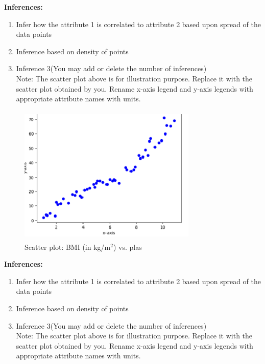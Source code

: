 \documentclass[12 pt, a4paper]{article}
\theoremstyle{definition}
\begin{document}
\textbf{\Large Inferences:}
\begin{enumerate}
   \item Infer how the attribute 1 is correlated to attribute 2 based upon spread of the data points
   \item Inference based on density of points
   \item Inference 3(You may add or delete the number of inferences)
\\Note: The scatter plot above is for illustration purpose. Replace it with the scatter plot obtained by you. Rename x-axis legend and y-axis legends with appropriate attribute names with units.

\end{enumerate}

\begin{figure}[H]
	\centering
	\includegraphics[width=8.5cm,height=6.65cm]{Scatter Plot.png}
	\caption{Scatter plot: BMI (in kg/m$^{2 }$) vs. plas}
	\label{Blockdia}
\end{figure}

\textbf{\Large Inferences:}
\begin{enumerate}
   \item Infer how the attribute 1 is correlated to attribute 2 based upon spread of the data points
   \item Inference based on density of points
   \item Inference 3(You may add or delete the number of inferences)
\\Note: The scatter plot above is for illustration purpose. Replace it with the scatter plot obtained by you. Rename x-axis legend and y-axis legends with appropriate attribute names with units.

\end{enumerate}
\end{document}
